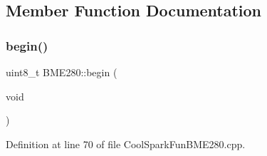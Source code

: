\subsection{Member Function Documentation}
\mbox{\label{class_b_m_e280_a994c102f010547f9c740a338ef9905c7}} 
\subsubsection{\texorpdfstring{begin()}{begin()}}
{\footnotesize\ttfamily uint8\+\_\+t B\+M\+E280\+::begin (\begin{DoxyParamCaption}\item[{void}]{ }\end{DoxyParamCaption})}



Definition at line 70 of file Cool\+Spark\+Fun\+B\+M\+E280.\+cpp.



